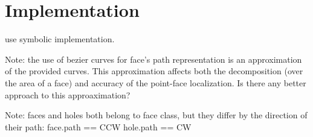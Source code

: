 \section{Implementation} \label{sec:implementation}
use symbolic implementation.

Note:
the use of bezier curves for face's path representation is an approximation of the provided curves.
This approximation affects both the decomposition (over the area of a face) and accuracy of the point-face localization.
Is there any better approach to this approaximation? 


Note:
faces and holes both belong to face class, but they differ by the direction of their path: 
face.path == CCW
hole.path == CW

